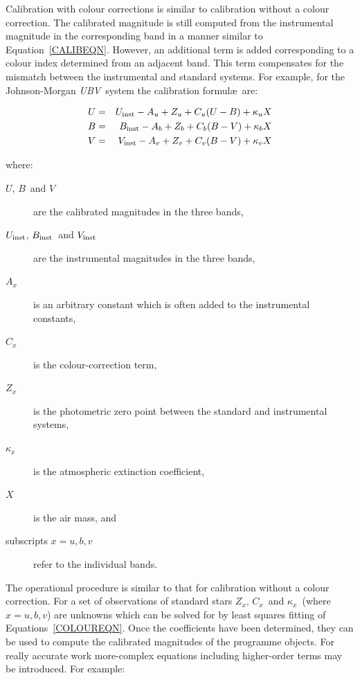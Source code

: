 \documentclass[twoside,11pt,nolof]{starlink}
\begin{document}
Calibration with colour corrections is similar to calibration without
a colour correction.  The calibrated magnitude is still computed from
the instrumental magnitude in the corresponding band in a manner similar
to Equation~\ref{CALIBEQN}.  However, an additional term is added
corresponding to a colour index determined from an adjacent band.  This
term compensates for the mismatch between the instrumental and standard
systems.  For example, for the Johnson-Morgan \textit{UBV}\, system the
calibration formul\ae\ are:

  \begin{eqnarray}
   U & = & U_{\rm inst} - A_{u} + Z_{u} + C_{u} ( U - B ) + \kappa_{u} X
     \nonumber  \\
   B & = & B_{\rm inst} - A_{b} + Z_{b} + C_{b} ( B - V ) + \kappa_{b} X
     \label{COLOUREQN} \\
   V & = & V_{\rm inst} - A_{v} + Z_{v} + C_{v} ( B - V ) + \kappa_{v} X
     \nonumber
  \end{eqnarray}

where:

\begin{description}

  \item[{\rm $U$, $B$\, and $V$}] are the calibrated magnitudes in the
   three bands,

  \item[{\rm $U_{\rm inst}$, $B_{\rm inst}$\, and $V_{\rm inst}$}] are
   the instrumental magnitudes in the three bands,

  \item[$A_{x}$] is an arbitrary constant which is often added to the
   instrumental constants,

  \item[$C_{x}$] is the colour-correction term,

  \item[$Z_{x}$] is the photometric zero point between the standard and
   instrumental systems,

  \item[$\kappa_{x}$] is the atmospheric extinction coefficient,

  \item[$X$] is the air mass, and

  \item[{\rm subscripts $x = u, b, v$}] refer to the individual bands.

\end{description}

The operational procedure is similar to that for calibration without a
colour correction.  For a set of observations of standard stars $Z_{x}$,
$C_{x}$\, and $\kappa_{x}$\, (where $x = u, b, v$) are unknowns which
can be solved for by least squares fitting of Equations~\ref{COLOUREQN}.
Once the coefficients have been determined, they can be used to compute
the calibrated magnitudes of the programme objects.  For really accurate
work more-complex equations including higher-order terms may be
introduced.  For example:
\end{document}
